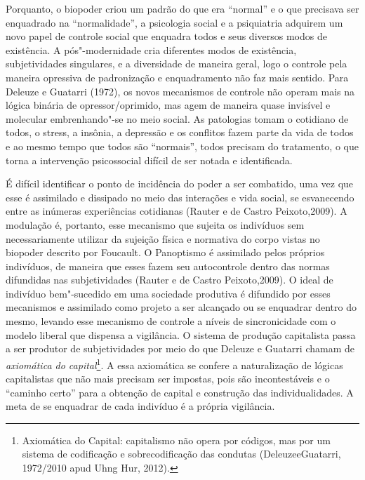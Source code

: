 Porquanto, o biopoder criou um padrão do que era ``normal'' e o que
precisava ser enquadrado na ``normalidade'', a psicologia social e a
psiquiatria adquirem um novo papel de controle social que enquadra todos
e seus diversos modos de existência. A pós"-modernidade cria diferentes
modos de existência, subjetividades singulares, e a diversidade de
maneira geral, logo o controle pela maneira opressiva de padronização e
enquadramento não faz mais sentido. Para Deleuze e Guatarri (1972), os
novos mecanismos de controle não operam mais na lógica binária de
opressor/oprimido, mas agem de maneira quase invisível e molecular
embrenhando"-se no meio social. As patologias tomam o cotidiano de todos,
o stress, a insônia, a depressão e os conflitos fazem parte da vida de
todos e ao mesmo tempo que todos são ``normais'', todos precisam do
tratamento, o que torna a intervenção psicossocial difícil de ser notada
e identificada.

É difícil identificar o ponto de incidência do poder a ser combatido,
uma vez que esse é assimilado e dissipado no meio das interações e vida
social, se esvanecendo entre as inúmeras experiências cotidianas (Rauter
e de Castro Peixoto,2009). A modulação é, portanto, esse mecanismo que
sujeita os indivíduos sem necessariamente utilizar da sujeição física e
normativa do corpo vistas no biopoder descrito por Foucault. O
Panoptismo é assimilado pelos próprios indivíduos, de maneira que esses
fazem seu autocontrole dentro das normas difundidas nas subjetividades
(Rauter e de Castro Peixoto,2009). O ideal de indivíduo bem"-sucedido em
uma sociedade produtiva é difundido por esses mecanismos e assimilado
como projeto a ser alcançado ou se enquadrar dentro do mesmo, levando
esse mecanismo de controle a níveis de sincronicidade com o modelo
liberal que dispensa a vigilância. O sistema de produção capitalista
passa a ser produtor de subjetividades por meio do que Deleuze e
Guatarri chamam de \emph{axiomática do capital}\footnote{Axiomática do
  Capital: capitalismo não opera por códigos, mas por um sistema de
  codificação e sobrecodificação das condutas (DeleuzeeGuatarri,
  1972/2010 apud Uhng Hur, 2012).}. A essa axiomática se confere a
naturalização de lógicas capitalistas que não mais precisam ser
impostas, pois são incontestáveis e o ``caminho certo'' para a obtenção
de capital e construção das individualidades. A meta de se enquadrar de
cada indivíduo é a própria vigilância.


